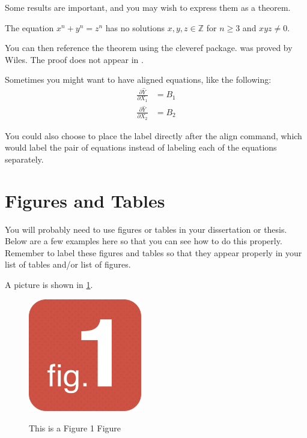 Some results are important, and you may wish to express them as a theorem.

\begin{theorem}\label{theorem 1}  The equation $x^n+y^n=z^n$ has no solutions $x,y,z\in \mathbb Z$ for $n\geq 3$ and $xyz\neq 0$.
\end{theorem}

You can then reference the theorem using the \textsf{cleveref} package.  was proved by Wiles.  The proof does not appear in \citet{kopka2004guide}.

Sometimes you might want to have aligned equations, like the following:
\begin{align} %
	\frac{\partial\hat{Y}}{\partial X_1} &= B_1 \label{eq:Equation2} \\
	\frac{\partial\hat{Y}}{\partial X_2} &= B_2 \label{eq:Equation3}
\end{align}

You could also choose to place the label directly after the align command, which would label the pair of equations instead of labeling each of the equations separately. 

\section{Figures and Tables}

You will probably need to use figures or tables in your dissertation or thesis. Below are a few examples here so that you can see how to do this properly. Remember to label these figures and tables so that they appear properly in your list of tables and/or list of figures.

A picture is shown in  \cref{fig:fig1}.
\begin{figure}[h]
\begin{center}
{\mbox{\includegraphics[height=140pt]{fig1.png}}}
\end{center}
\caption{\label{fig:fig1}This is a Figure 1 Figure}
\end{figure}

